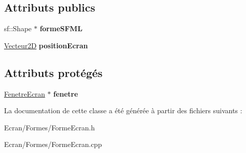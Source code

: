 \subsection*{Attributs publics}
\begin{DoxyCompactItemize}
\item 
\mbox{\label{class_forme_ecran_ae4802e73968518593b6249ed52c7f42f}} 
sf\+::\+Shape $\ast$ {\bfseries forme\+S\+F\+ML}
\item 
\mbox{\label{class_forme_ecran_a0f01418938b55cdea36396e2d215b4cf}} 
\mbox{\hyperlink{class_vecteur2_d}{Vecteur2D}} {\bfseries position\+Ecran}
\end{DoxyCompactItemize}
\subsection*{Attributs protégés}
\begin{DoxyCompactItemize}
\item 
\mbox{\label{class_forme_ecran_a65ab2b50df82aa93e629bf7df1a5ff09}} 
\mbox{\hyperlink{class_fenetre_ecran}{Fenetre\+Ecran}} $\ast$ {\bfseries fenetre}
\end{DoxyCompactItemize}


La documentation de cette classe a été générée à partir des fichiers suivants \+:\begin{DoxyCompactItemize}
\item 
Ecran/\+Formes/Forme\+Ecran.\+h\item 
Ecran/\+Formes/Forme\+Ecran.\+cpp\end{DoxyCompactItemize}
